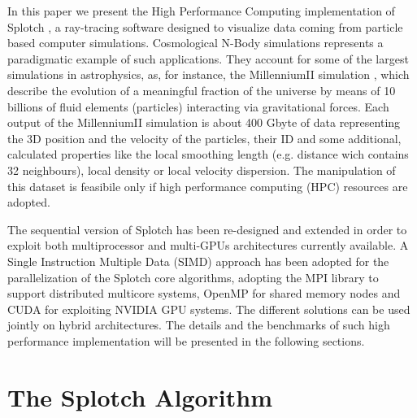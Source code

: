 In this paper we present the High Performance Computing implementation of
Splotch \citep{2008NJPh...10l5006D}, a ray-tracing software designed to visualize data coming from particle 
based computer simulations. Cosmological N-Body simulations represents a paradigmatic
example of such applications. They account for some of the largest simulations in astrophysics, 
as, for instance, the MillenniumII simulation \citep{2009MNRAS.398.1150B}, which describe the evolution 
of a meaningful fraction of the universe by means of 10 billions of fluid elements
(particles) interacting via gravitational forces. Each output of the MillenniumII 
simulation is about 400 Gbyte of data representing the 
3D position and the velocity of the particles, their ID and some additional, calculated
properties like the local smoothing length (e.g. distance wich contains 32 neighbours),
local density or local velocity dispersion. The manipulation of this dataset is feasibile 
only if high performance computing (HPC) resources are adopted. 

The sequential version of Splotch \cite{2008NJPh...10l5006D} has been re-designed and extended in order
to exploit both multiprocessor and multi-GPUs architectures currently available. 
A Single Instruction Multiple Data (SIMD) approach has been adopted for the parallelization
of the Splotch core algorithms, adopting the MPI library to support distributed multicore systems, 
OpenMP for shared memory nodes and CUDA for exploiting NVIDIA GPU systems. The different 
solutions can be used jointly on hybrid architectures. The details and
the benchmarks of such high performance implementation will be presented in the following sections.  


\section{The Splotch Algorithm}
\label{splotch}

